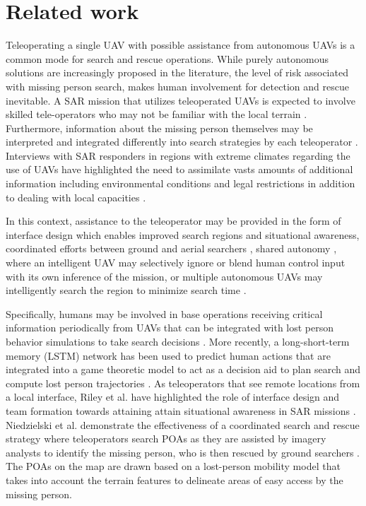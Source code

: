 \documentclass{article}
\begin{document}
\section{Related work}

Teleoperating a single UAV with possible assistance from autonomous UAVs is a common mode for search and rescue operations. While purely autonomous  solutions are increasingly proposed in the literature, the level of risk associated with missing person search, makes human involvement for detection and rescue inevitable. A SAR mission that utilizes teleoperated UAVs is expected to involve skilled tele-operators who may not be familiar with the local terrain \cite{}. Furthermore, information about the missing person themselves may be interpreted and integrated differently into search strategies by each teleoperator \cite{}. Interviews with SAR responders in regions with extreme climates regarding the use of UAVs have highlighted the need to assimilate vasts amounts of additional information including environmental conditions and legal restrictions in addition to dealing with local capacities \cite{Clark2018}. 

In this context, assistance to the teleoperator may be provided in the form of interface design which enables improved search regions \cite{Nourbakhsh2005, Goodrich2007using, heintzman2021predictive} and situational awareness\cite{Riley2004}, coordinated efforts between ground and aerial searchers \cite{niedzielski2018real}, shared autonomy \cite{wegner2006agent}, where an intelligent UAV may selectively ignore or blend human control input with its own inference of the mission, or multiple autonomous UAVs may intelligently search the region to minimize search time \cite{hardin2009using}. 

Specifically, humans may be involved in base operations receiving critical information periodically from UAVs that can be integrated with lost person behavior simulations to take search decisions \cite{Nourbakhsh2005, Goodrich2007using}. More recently, a long-short-term memory (LSTM) network has been used to predict human actions that are integrated into a game theoretic model to act as a decision aid to plan search and compute lost person trajectories \cite{heintzman2021predictive}. As teleoperators that see remote locations from a local interface, Riley et al. have highlighted the role of interface design and team formation towards attaining attain situational awareness in SAR missions \cite{Riley2004}. Niedzielski et al. demonstrate the effectiveness of a coordinated search and rescue strategy where teleoperators search POAs as they are assisted by imagery analysts to identify the missing person, who is then rescued by ground searchers \cite{niedzielski2018real}. The POAs on the map are drawn based on a lost-person mobility model that takes into account the terrain features to delineate areas of easy access by the missing person. 
\end{document}
